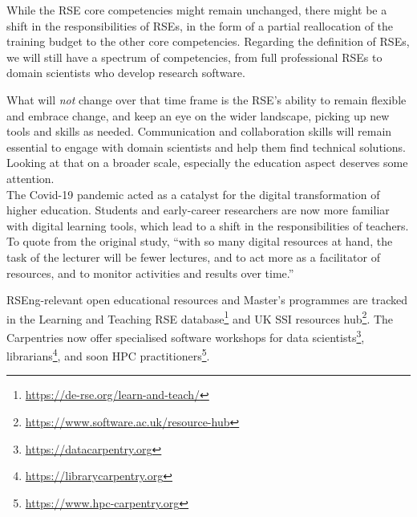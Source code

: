 \documentclass{eceasst}
\begin{document}
While the RSE core competencies\cite{Goth2024} might remain unchanged,
there might be a shift in the responsibilities of RSEs,
in the form of a partial reallocation of the training budget
to the other core competencies.
Regarding the definition of RSEs, we will still have a spectrum of competencies,
from full professional RSEs to domain scientists who develop research software.

What will \emph{not} change over that time frame is the RSE's ability to remain
flexible and embrace change, and keep an eye on the wider landscape,
picking up new tools and skills as needed.
Communication and collaboration skills will remain essential to engage
with domain scientists and help them find technical solutions.\\

Looking at that on a broader scale, especially the education aspect deserves some attention.\\
The Covid-19 pandemic acted as a catalyst for the digital transformation
of higher education\cite{Bygstad2022}. Students and early-career researchers
are now more familiar with digital learning tools, which lead to a shift
in the responsibilities of teachers. To quote from the original study,
``with so many digital resources at hand,
the task of the lecturer will be fewer lectures,
and to act more as a facilitator of resources,
and to monitor activities and results over time.''\cite{Bygstad2022}


RSEng-relevant open educational resources and Master's programmes are tracked
in the Learning and Teaching RSE database\footnote{\url{https://de-rse.org/learn-and-teach/}}
and UK SSI resources hub\footnote{\url{https://www.software.ac.uk/resource-hub}}.
The Carpentries now offer specialised software workshops
for data scientists\footnote{\url{https://datacarpentry.org}},
librarians\footnote{\url{https://librarycarpentry.org}},
and soon HPC practitioners\footnote{\url{https://www.hpc-carpentry.org}}.
\end{document}
